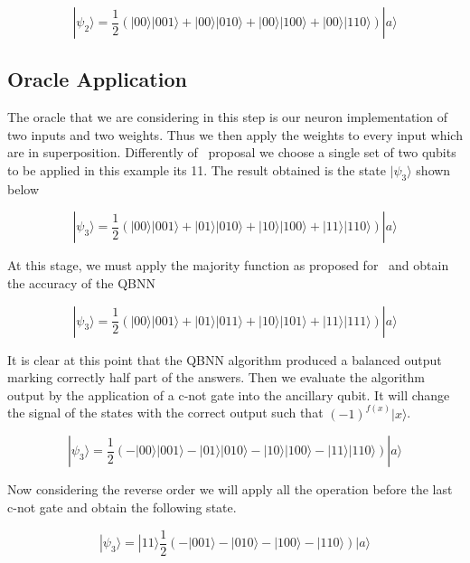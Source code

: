 \documentclass[conference]{IEEEtran}
\begin{document}
\begin{equation}
|\psi_2\rangle = \frac{1}{2}(|00\rangle|001\rangle + |00\rangle|010\rangle + |00\rangle|100\rangle + |00\rangle|110\rangle)
|a\rangle
\end{equation}

\subsection{Oracle Application}\label{subsec:oracle-application}

The oracle that we are considering in this step is our neuron implementation of two inputs and two weights.
Thus we then apply the weights to every input which are in superposition.
Differently of~\cite{fawaz2019training} proposal we choose a single set of two qubits to be applied in this example its 11.
The result obtained is the state $|\psi_3\rangle$ shown below

\begin{equation}
|\psi_3\rangle = \frac{1}{2}(|00\rangle|001\rangle + |01\rangle|010\rangle + |10\rangle|100\rangle + |11\rangle|110\rangle)
|a\rangle
\end{equation}

At this stage, we must apply the majority function as proposed for~\cite{fawaz2019training} and obtain the accuracy of
the QBNN

\begin{equation}
|\psi_3\rangle = \frac{1}{2}(|00\rangle|001\rangle + |01\rangle|011\rangle + |10\rangle|101\rangle + |11\rangle|111\rangle)
|a\rangle
\end{equation}

It is clear at this point that the QBNN algorithm produced a balanced output marking correctly half part of the answers.
Then we evaluate the algorithm output by the application of a c-not gate into the ancillary qubit.
It will change the signal of the states with the correct output such that \((-1)^{f(x)}|x\rangle\).

\begin{equation}
|\psi_3\rangle = \frac{1}{2}(-|00\rangle|001\rangle - |01\rangle|010\rangle - |10\rangle|100\rangle - |11\rangle|110\rangle)
|a\rangle
\end{equation}

Now considering the reverse order we will apply all the operation before the last c-not gate and obtain the following state.

\begin{equation}
|\psi_3\rangle = |11\rangle\frac{1}{2}(-|001\rangle - |010\rangle - |100\rangle - |110\rangle)
|a\rangle
\end{equation}
\end{document}
